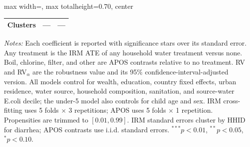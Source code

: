 \begin{landscape}
\begin{table}[htbp]
\begin{adjustbox}{max width=\linewidth, max totalheight=0.70\textwidth, center}
\begin{tabular}{l|ccccccc|ccccccc}
Clusters & \multicolumn{7}{c|}{---} & \multicolumn{7}{c}{---} \\
\bottomrule
\end{tabular}
\end{adjustbox}
\par\vspace{3pt}
\begin{minipage}{\linewidth}\scriptsize \textit{Notes:} Each coefficient is reported with significance stars over its standard error. Any treatment is the IRM ATE of any household water treatment versus none. Boil, chlorine, filter, and other are APOS contrasts relative to no treatment. RV and RV$_\alpha$ are the robustness value and its 95\% confidence-interval-adjusted version. All models control for wealth, education, country fixed effects, urban residence, water source, household composition, sanitation, and source-water E.coli decile; the under-5 model also controls for child age and sex. IRM cross-fitting uses 5 folds $\times$ 3 repetitions; APOS uses 5 folds $\times$ 1 repetition. Propensities are trimmed to $[0.01,0.99]$. IRM standard errors cluster by HHID for diarrhea; APOS contrasts use i.i.d. standard errors. $^{***}p<0.01$, $^{**}p<0.05$, $^{*}p<0.10$.\end{minipage}
\end{table}
\end{landscape}
